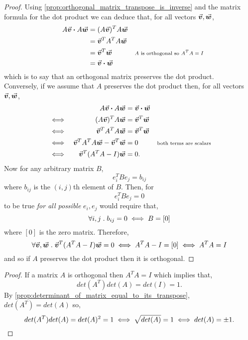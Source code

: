 \documentclass[../MathsNotesBase.tex]{subfiles}
\begin{document}
{		\bigskip
		\begin{proof}
			Using \autoref{prop:orthogonal_matrix_transpose_is_inverse} and the matrix formula for the dot product we can deduce that, for all vectors ${ \vec{\bm{v}},\vec{\bm{w}} }$,
			\begin{align*}
			&& A\vec{\bm{v}} \boldsymbol{\cdot} A\vec{\bm{w}} &= (A\vec{\bm{v}})^T A\vec{\bm{w}} \\
			&&  &= \vec{\bm{v}}^TA^TA\vec{\bm{w}} &\text{\scriptsize{}} \\
			&&  &= \vec{\bm{v}}^T\vec{\bm{w}} &\text{\scriptsize{$A$ is orthogonal so ${A^TA = I}$}} \\
			&&  &= \vec{\bm{v}} \boldsymbol{\cdot} \vec{\bm{w}}
			\end{align*}
			which is to say that an orthogonal matrix preserves the dot product.\\
			
			Conversely, if we assume that $A$ preserves the dot product then, for all vectors ${ \vec{\bm{v}},\vec{\bm{w}} }$,
			\begin{align*}
			&& A\vec{\bm{v}} \boldsymbol{\cdot} A\vec{\bm{w}} &= \vec{\bm{v}} \boldsymbol{\cdot} \vec{\bm{w}}  \\
			&\iff & (A\vec{\bm{v}})^TA\vec{\bm{w}} &= \vec{\bm{v}}^T\vec{\bm{w}} & \\
			&\iff & \vec{\bm{v}}^TA^TA\vec{\bm{w}} &= \vec{\bm{v}}^T\vec{\bm{w}} & \\
			&\iff & \vec{\bm{v}}^TA^TA\vec{\bm{w}} - \vec{\bm{v}}^T\vec{\bm{w}} &= 0 & \text{\scriptsize{both terms are scalars}}\\
			&\iff & \vec{\bm{v}}^T(A^TA - I)\vec{\bm{w}} &= 0. &
			\end{align*}
			Now for any arbitrary matrix $B$, 
			\[ e_i^TBe_j = b_{ij} \]
			where $b_{ij}$ is the $(i,j)$th element of $B$. Then, for
			\[ e_i^TBe_j = 0 \]
			to be true \textit{for all possible} ${ e_i,e_j }$ would require that, 
			\[ \forall i,j \;.\; b_{ij} = 0 \iff B = [0] \]
			where $[0]$ is the zero matrix. Therefore,
			\[ \forall \vec{\bm{v}},\vec{\bm{w}} \;.\; \vec{\bm{v}}^T(A^TA - I)\vec{\bm{w}} = 0 \iff A^TA - I = [0] \iff A^TA = I \]
			and so if $A$ preserves the dot product then it is orthogonal.
		\end{proof}
	
	
		\bigskip
		\begin{proof}
			If a matrix $A$ is orthogonal then ${ A^TA = I }$ which implies that,
			\[ det(A^T)det(A) = det(I) = 1. \]
			By \autoref{prop:determinant_of_matrix_equal_to_its_transpose}, ${ det(A^T) = det(A) }$ so,
			\[ det(A^T)det(A) = det(A)^2 = 1 \iff \sqrt{det(A)} = 1 \iff det(A) = \pm 1.  \qedhere \]
		\end{proof}
	
}
\end{document}

